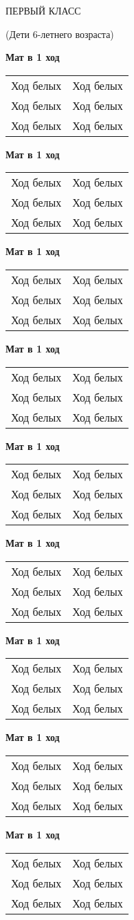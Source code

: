 \documentclass[12pt]{article}
\newcounter{boardcount}
\newcommand{\board}[1]
{
    \begin{minipage}[t][8.3cm][t]{9cm}
      \fenboard{#1 w - - 0 1}
      \makebox[6ex]{\raisebox{35ex}{\Large\textbf{\theboardcount\LARGE{$\blacktriangleright$}}}} \hskip 0.2cm
      \showboard
      \par
      \hskip 3.5cm Ход белых
    \end{minipage}
    \stepcounter{boardcount}
}
\newcommand{\pagetitle}{{\Large\bf{Мат в 1 ход}}\vskip 0.6cm}
\newcommand{\page}[6]
           {
    \pagetitle
    \begin{tabular}{cc}
    \board{#1}  &
    \board{#2} \\
    \board{#3}  &
    \board{#4} \\
    \board{#5}  &
    \board{#6} \\
    \end{tabular}
    \newpage
}
\begin{document}
\begin{center}
\Large\bf{
ПЕРВЫЙ КЛАСС

(Дети 6-летнего возраста)
}
\end{center}
\begin{center}
  \page{4k3/8/4K3/8/8/8/R7/8}
       {4k3/7R/8/8/8/3K4/8/R7}
       {5k2/p7/5K2/8/8/8/Q7/8}
       {7k/8/6K1/8/8/8/B6B/8}
       {7k/5ppp/8/8/8/6P1/5PK1/R7}
       {4qrk1/5ppp/8/8/8/6P1/1Q4K1/R7}
  \page{7k/8/6KN/B7/8/8/8/8}
       {4k3/7R/3KN3/8/8/8/8/q7}
       {R7/8/8/8/8/5K2/7p/6k1}
       {5qk1/Q7/6K1/8/8/8/8/8}
       {8/kppN4/8/8/8/1P6/1KP5/2R5}
       {5rk1/5p2/5Bp1/8/8/8/6K1/7R}       
  \page{2r5/2p5/kpB5/8/2R5/1K6/8/8}
       {k1b5/p2R4/1pN5/8/8/1K6/8/8}
       {kr6/7Q/1P6/8/2K5/8/8/8}
       {Q7/8/5pkp/8/8/4rqPK/8/8}
       {8/7K/Q7/4q3/8/7p/7p/7k}
       {krr5/pp6/8/8/N7/1K6/8/R7}       
  \page{8/8/8/8/p7/kn6/8/NK6}
       {4k3/1N1nn3/4N2K/8/8/8/8/8}
       {Krk5/p7/pP6/8/8/8/8/8}
       {5b1r/6kp/8/6KP/8/8/B7/8}
       {kb6/8/1K6/8/8/7B/8/8}
       {6bk/p6p/5b2/8/8/1P6/P1P4P/B6K}
  \page{8/1K6/7B/2k5/2Pp4/3P4/8/q7}
       {3R4/5pkp/5Np1/6P1/8/8/6K1/8}
       {8/8/8/8/8/8/5K1p/5N1k}
       {5rk1/5N1p/6p1/8/8/8/6K1/B7}
       {7Q/8/8/8/4q3/3k4/1K2p3/8}
       {5n1k/6Rp/6p1/4B3/8/8/6K1/8}       
  \page{8/8/8/2N5/8/8/4p3/2K1kn2}
       {3R4/1p2p1kp/2r1B3/1q2n1Pp/4P3/8/PPP5/2K5}
       {8/5Np1/p7/4qp2/2K1kn2/4b3/8/8}
       {8/1p1R3p/p3pkp1/Q7/2r1q2P/2P5/P4PP1/6K1}
       {8/8/4bp2/4p3/4P3/k4P2/1pR5/1K1N4}
       {rn2r2k/p4pR1/2pb1p2/1p5P/3P3P/1KPBB3/1P1QNP2/q2R4}       
  \page{r4Br1/p1q2p1k/1p1R4/3pP2p/8/2p5/P1P1NPPP/6K1}
       {1bk1r2r/p2n3p/2p2n2/B1P3p1/3P1pbq/2NB4/PP4PP/R2R1NK1}
       {8/np1K4/1k6/p7/8/8/1N6/5B2}
       {8/7R/2r6/8/P3n3/5n2/4q1PP/R6K}
       {3r1r1k/pb2npp1/1p2p1p1/3k4/8/1PQ3P1/PB2PP2/2R2RK1}
       {1r1q1k2/R4p1B/3Pb2p/4Q1p1/1p6/2p3PP/1P3P2/6K1}       

  \page{6q1/5p1p/1r4N1/8/8/1P2P2q/1Q3P1P/6K1}
       {1kbn4/2r5/1N6/8/8/1R6/R7/3K4}
       {r2qkb1r/1bp2ppp/p4n2/3p4/8/5p2/PPP1BPPP/RNBQR1K1}
       {r2qbb1r/1pp1k1p1/p1n4p/8/3Pp3/1B5Q/PPP2PPP/RNB3K1}
       {rn4r1/1p2np1k/2p1pPp1/4R3/8/1P5P/Pq4P1/1B4RK}
       {rn1q1bnr/ppp1kBp1/3p3p/4N3/4P3/2N5/PPPP1PPP/R1BbK2R}       
  \page{}
       {}
       {}
       {}
       {}
       {}       

\end{center}
\end{document}

